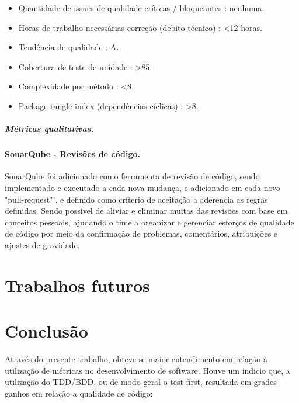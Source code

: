 \documentclass[12pt]{article}
\begin{document}
 \begin{itemize}
 	\item Quantidade de issues de qualidade críticas / bloqueantes : nenhuma.
 	\item Horas de trabalho necessárias correção (debito técnico) : \textless 12 horas.
 	\item Tendência de qualidade : A.
 	\item Cobertura de teste de unidade : \textgreater 85.
 	\item Complexidade por método : \textless 8.
 	\item Package tangle index (dependências cíclicas) : \textgreater 8.
 \end{itemize}

\subsubsection{Métricas qualitativas.} \label{sec:sonar-planning-mquality}



\subsection{SonarQube - Revisões de código.} \label{sec:sonar-review}
SonarQube foi adicionado como ferramenta de revisão de código, sendo implementado e executado a cada nova mudança, e adicionado em cada novo "pull-request"', e definido como críterio de aceitação a aderencia as regras definidas.
Sendo possivel de aliviar e eliminar muitas das revisões com base em conceitos pessoais, ajudando o time a organizar e gerenciar esforços de qualidade de código por meio da confirmação de problemas, comentários, atribuições e ajustes de gravidade. 

\part{Trabalhos futuros} \label{sec:trabalhos_futuros}

\part{Conclusão} \label{sec:conclusao}

Através do presente trabalho, obteve-se maior entendimento em relação à utilização de métricas no desenvolvimento de software.
Houve um indicio que, a utilização do TDD/BDD, ou de modo geral o test-first, resultada em grades ganhos em relação a qualidade de código:
\end{document}
